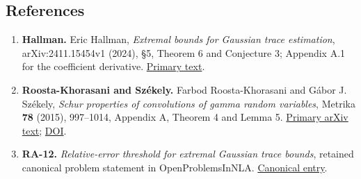 \documentclass[10pt,a4paper]{article}
\providecommand{\tightlist}{\setlength{\itemsep}{0pt}\setlength{\parskip}{0pt}}
\begin{document}
\begingroup
\sloppy

\subsection{References}\label{references}

\begin{enumerate}
\def\labelenumi{\arabic{enumi}.}
\tightlist
\item
  \textbf{Hallman.} Eric Hallman, \emph{Extremal bounds for Gaussian
  trace estimation}, arXiv:2411.15454v1 (2024), §5, Theorem 6 and
  Conjecture 3; Appendix A.1 for the coefficient derivative.
  \href{https://arxiv.org/html/2411.15454v1}{Primary text}.
\item
  \textbf{Roosta-Khorasani and Székely.} Farbod Roosta-Khorasani and
  Gábor J. Székely, \emph{Schur properties of convolutions of gamma
  random variables}, Metrika \textbf{78} (2015), 997--1014, Appendix A,
  Theorem 4 and Lemma 5.
  \href{https://arxiv.org/html/1601.04731v1}{Primary arXiv text};
  \href{https://doi.org/10.1007/s00184-015-0537-9}{DOI}.
\item
  \textbf{RA-12.} \emph{Relative-error threshold for extremal Gaussian
  trace bounds}, retained canonical problem statement in
  OpenProblemsInNLA.
  \href{https://github.com/ajt60gaibb/OpenProblemsInNLA/blob/main/randomized-and-low-rank-approximation/RA-12/README.md}{Canonical
  entry}.
\end{enumerate}

\endgroup
\end{document}
